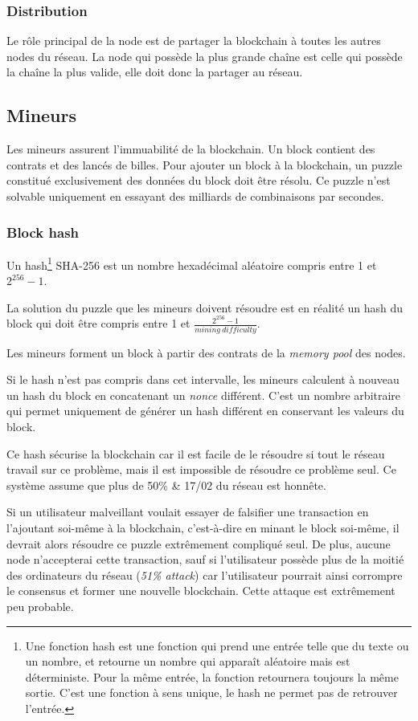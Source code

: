 \documentclass{article}
\begin{document}
\subsubsection{Distribution}
Le rôle principal de la node est de partager la blockchain à toutes les autres nodes du réseau. 
La node qui possède la plus grande chaîne est celle qui possède la chaîne la plus valide, elle doit donc la partager au réseau.

\subsection{Mineurs}
Les mineurs assurent l'immuabilité de la blockchain.
Un block contient des contrats et des lancés de billes. Pour ajouter un block à la blockchain, un puzzle constitué exclusivement des données du block doit être résolu. Ce puzzle n'est solvable uniquement en essayant des milliards de combinaisons par secondes.

\subsubsection{Block hash}

Un hash\footnote{Une fonction hash est une fonction qui prend une entrée telle que du texte ou un nombre, et retourne un nombre qui apparaît aléatoire mais est déterministe. Pour la même entrée, la fonction retournera toujours la même sortie. C'est une fonction à sens unique, le hash ne permet pas de retrouver l'entrée.} SHA-256 est un nombre hexadécimal aléatoire compris entre 1 et $2^{256} - 1$.

La solution du puzzle que les mineurs doivent résoudre est en réalité un hash du block qui doit être compris entre 1 et $\frac{2^{256}-1}{mining\ difficulty}$.

Les mineurs forment un block à partir des contrats de la \textit{memory pool} des nodes.

Si le hash n'est pas compris dans cet intervalle, les mineurs calculent à nouveau un hash du block en concatenant un \textit{nonce} différent. C'est un nombre arbitraire qui permet uniquement de générer un hash différent en conservant les valeurs du block.

Ce hash sécurise la blockchain car il est facile de le résoudre si tout le réseau travail sur ce problème, mais il est impossible de résoudre ce problème seul. Ce système assume que plus de 50\% & 17/02 du réseau est honnête.

Si un utilisateur malveillant voulait essayer de falsifier une transaction en l'ajoutant soi-même à la blockchain, c'est-à-dire en minant le block soi-même, il devrait alors résoudre ce puzzle extrêmement compliqué seul. De plus, aucune node n'accepterai cette transaction, sauf si l'utilisateur possède plus de la moitié des ordinateurs du réseau (\textit{51\% attack}) car l'utilisateur pourrait ainsi corrompre le consensus et former une nouvelle blockchain.
Cette attaque est extrêmement peu probable.
\end{document}
